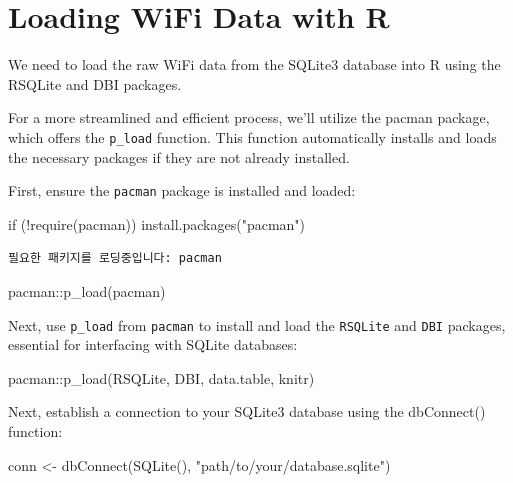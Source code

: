 \documentclass[
  letterpaper,
]{scrbook}
\newenvironment{Shaded}{\begin{snugshade}}{\end{snugshade}}
\newcommand{\ControlFlowTok}[1]{\textcolor[rgb]{0.00,0.23,0.31}{#1}}
\newcommand{\FunctionTok}[1]{\textcolor[rgb]{0.28,0.35,0.67}{#1}}
\newcommand{\NormalTok}[1]{\textcolor[rgb]{0.00,0.23,0.31}{#1}}
\newcommand{\OtherTok}[1]{\textcolor[rgb]{0.00,0.23,0.31}{#1}}
\newcommand{\SpecialCharTok}[1]{\textcolor[rgb]{0.37,0.37,0.37}{#1}}
\newcommand{\StringTok}[1]{\textcolor[rgb]{0.13,0.47,0.30}{#1}}
\begin{document}
\section{Loading WiFi Data with R}\label{loading-wifi-data-with-r}

We need to load the raw WiFi data from the SQLite3 database into R using
the RSQLite and DBI packages.

For a more streamlined and efficient process, we'll utilize the pacman
package, which offers the \texttt{p\_load} function. This function
automatically installs and loads the necessary packages if they are not
already installed.

First, ensure the \texttt{pacman} package is installed and loaded:

\begin{Shaded}
\begin{Highlighting}[]
\ControlFlowTok{if}\NormalTok{ (}\SpecialCharTok{!}\FunctionTok{require}\NormalTok{(pacman)) }\FunctionTok{install.packages}\NormalTok{(}\StringTok{"pacman"}\NormalTok{)}
\end{Highlighting}
\end{Shaded}

\begin{verbatim}
필요한 패키지를 로딩중입니다: pacman
\end{verbatim}

\begin{Shaded}
\begin{Highlighting}[]
\NormalTok{pacman}\SpecialCharTok{::}\FunctionTok{p\_load}\NormalTok{(pacman)}
\end{Highlighting}
\end{Shaded}

Next, use \texttt{p\_load} from \texttt{pacman} to install and load the
\texttt{RSQLite} and \texttt{DBI} packages, essential for interfacing
with SQLite databases:

\begin{Shaded}
\begin{Highlighting}[]
\NormalTok{pacman}\SpecialCharTok{::}\FunctionTok{p\_load}\NormalTok{(RSQLite, DBI, data.table, knitr)}
\end{Highlighting}
\end{Shaded}

Next, establish a connection to your SQLite3 database using the
dbConnect() function:

\begin{Shaded}
\begin{Highlighting}[]
\NormalTok{conn }\OtherTok{\textless{}{-}} \FunctionTok{dbConnect}\NormalTok{(}\FunctionTok{SQLite}\NormalTok{(), }\StringTok{"path/to/your/database.sqlite"}\NormalTok{)}
\end{Highlighting}
\end{Shaded}
\end{document}
